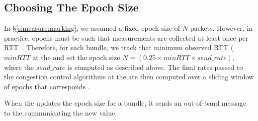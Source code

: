 \subsection{Choosing The Epoch Size}
\label{s:measure:epoch}
%

In \S\ref{s:measure:marking}, we assumed a fixed epoch size of $N$ packets. However, in practice, epochs must be such that measurements are collected at least once per RTT~\cite{ccp}. Therefore, for each bundle, we track that minimum observed RTT ($minRTT$ at the \inbox and set the epoch size $N = (0.25 \times minRTT \times send\_rate)$, where the $send\_rate$ is computed as described above. The final rates passed to the congestion control algorithms at the \inbox are then computed over a sliding window of epochs that corresponds . 




When the \inbox updates the epoch size for a bundle, it sends an out-of-band message to the \outbox communicating the new value. 



